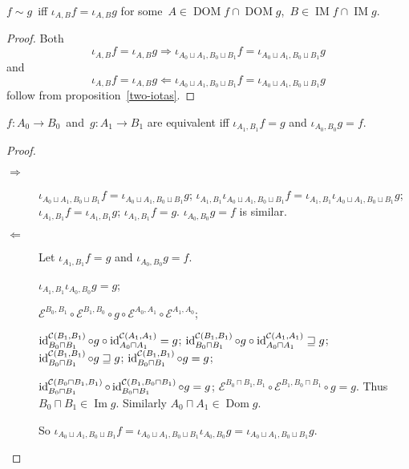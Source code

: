 \begin{prop}
$f\sim g$~iff $\iota_{A,B}f=\iota_{A,B}g$ for
some~$A\in\operatorname{DOM}f\cap\operatorname{DOM}g$,~$B\in\operatorname{IM}f\cap\operatorname{IM}g$.
\end{prop}

\begin{proof}
Both
\[\iota_{A,B}f=\iota_{A,B}g\Rightarrow
\iota_{A_0\sqcup A_1,B_0\sqcup B_1}f=\iota_{A_0\sqcup A_1,B_0\sqcup B_1}g\]
and
\[\iota_{A,B}f=\iota_{A,B}g\Leftarrow
\iota_{A_0\sqcup A_1,B_0\sqcup B_1}f=\iota_{A_0\sqcup A_1,B_0\sqcup B_1}g\]
follow from proposition~\ref{two-iotas}.
\end{proof}

\begin{thm}
$f:A_0\to B_0$~and~$g:A_1\to B_1$ are equivalent iff
$\iota_{A_1,B_1}f=g$ and $\iota_{A_0,B_0}g=f$.
\end{thm}

\begin{proof}
~
\begin{description}
\item[$\Rightarrow$]
$\iota_{A_0\sqcup A_1,B_0\sqcup B_1}f=\iota_{A_0\sqcup A_1,B_0\sqcup B_1}g$;
$\iota_{A_1,B_1}\iota_{A_0\sqcup A_1,B_0\sqcup B_1}f=\iota_{A_1,B_1}\iota_{A_0\sqcup A_1,B_0\sqcup B_1}g$;
$\iota_{A_1,B_1}f=\iota_{A_1,B_1}g$;
$\iota_{A_1,B_1}f=g$. $\iota_{A_0,B_0}g=f$ is similar.

\item[$\Leftarrow$] Let $\iota_{A_1, B_1} f = g$ and $\iota_{A_0, B_0} g = f$.

$\iota_{A_1, B_1} \iota_{A_0, B_0} g = g$;

$\mathcal{E}^{B_0, B_1} \circ \mathcal{E}^{B_1, B_0} \circ g \circ
\mathcal{E}^{A_0, A_1} \circ \mathcal{E}^{A_1, A_0}$;

$\operatorname{id}^{\mathcal{C} (B_1, B_1)}_{B_0 \sqcap B_1} \circ g \circ
\operatorname{id}^{\mathcal{C} (A_1, A_1)}_{A_0 \sqcap A_1} = g$;
$\operatorname{id}^{\mathcal{C} (B_1, B_1)}_{B_0 \sqcap B_1} \circ g \circ
\operatorname{id}^{\mathcal{C} (A_1, A_1)}_{A_0 \sqcap A_1} \sqsupseteq g$;
$\operatorname{id}^{\mathcal{C} (B_1, B_1)}_{B_0 \sqcap B_1} \circ g \sqsupseteq g$;
$\operatorname{id}^{\mathcal{C} (B_1, B_1)}_{B_0 \sqcap B_1} \circ g = g$;

$\operatorname{id}^{\mathcal{C} (B_0 \sqcap B_1, B_1)}_{B_0 \sqcap B_1} \circ
\operatorname{id}^{\mathcal{C} (B_1, B_0 \sqcap B_1)}_{B_0 \sqcap B_1} \circ g = g$;
$\mathcal{E}^{B_0 \sqcap B_1, B_1} \circ \mathcal{E}^{B_1, B_0 \sqcap B_1}
\circ g = g$. Thus $B_0 \sqcap B_1 \in \operatorname{Im} g$. Similarly $A_0 \sqcap A_1
\in \operatorname{Dom} g$.

So $\iota_{A_0 \sqcup A_1, B_0 \sqcup B_1} f = \iota_{A_0 \sqcup A_1, B_0
\sqcup B_1} \iota_{A_0, B_0} g = \iota_{A_0 \sqcup A_1, B_0 \sqcup B_1} g$.
\end{description}
\end{proof}

